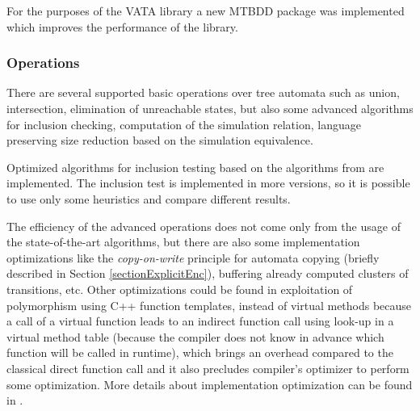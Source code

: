 For the purposes of the VATA library a new MTBDD package was implemented which improves the performance of the library.

\subsubsection{Operations}
There are several supported basic operations over tree automata 
such as union, intersection, elimination of unreachable states, but also some advanced algorithms for inclusion checking, 
computation of the simulation relation, language preserving size reduction based on the simulation equivalence. 

Optimized algorithms for inclusion testing based on the algorithms from \cite{cav06,tacas10} are implemented. 
The inclusion test is implemented in more versions, so it is possible
to use only some heuristics and compare different results.

The efficiency of the advanced operations does not come only from the usage of the state-of-the-art algorithms, 
but there are also some implementation optimizations like the \emph{copy-on-write}
principle for automata copying (briefly described in Section \ref{sectionExplicitEnc}), buffering already computed clusters of transitions, etc. 
Other optimizations could be found in exploitation of polymorphism using C++ function templates, instead of
virtual methods because a call of a virtual function leads to an indirect function call using look-up in a virtual method table 
(because the compiler does not know in advance which function will be called in runtime), which brings an overhead compared to the classical direct 
function call and it also precludes compiler's optimizer to perform some optimization. 
More details about implementation optimization can be found in \cite{libvata}.

